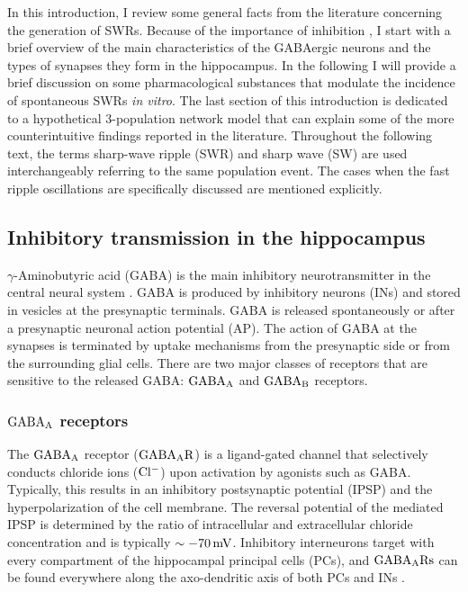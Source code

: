   In this introduction, I review some general facts from the literature
  concerning the generation of SWRs. Because of the importance of inhibition
  \citep[e.g.,][]{Maier2003, Schlingloff2014}, I start with a brief overview of
  the main characteristics of the GABAergic neurons and the types of synapses
  they form in the hippocampus. In the following I will provide a brief
  discussion on some pharmacological substances that modulate the incidence of
  spontaneous SWRs \textit{in vitro}. The last section of this introduction is
  dedicated to a hypothetical 3-population network model that can explain some
  of the more counterintuitive findings reported in the literature. Throughout
  the following text, the terms sharp-wave ripple (SWR) and sharp wave (SW) are
  used interchangeably referring to the same population event. The cases when
  the fast ripple oscillations are specifically discussed are mentioned
  explicitly.

  \subsection{Inhibitory transmission in the hippocampus}
    $\gamma$-Aminobutyric acid (GABA) is the main inhibitory neurotransmitter
    in the central neural system \citep{Sivilotti1991}. GABA is produced by
    inhibitory neurons (INs) and stored in vesicles at the presynaptic
    terminals. GABA is released spontaneously or after a presynaptic neuronal
    action potential (AP). The action of GABA at the synapses is terminated by
    uptake mechanisms from the presynaptic side or from the surrounding glial
    cells. There are two major classes of receptors that are sensitive to the
    released GABA: $\rm GABA_A$ and $\rm GABA_B$ receptors. 

    \subsubsection{$\rm GABA_A$ receptors}
    \label{sec:gabaa}
      The $\rm GABA_A $ receptor ($\rm GABA_A R$) is a ligand-gated channel
      that selectively conducts chloride ions ($\rm Cl^-$) upon activation by
      agonists such as GABA. Typically, this results in an inhibitory
      postsynaptic potential (IPSP) and the hyperpolarization of the cell
      membrane. The reversal potential of the mediated IPSP is determined by
      the ratio of intracellular and extracellular chloride concentration and
      is typically $\sim -70\, \rm mV$. Inhibitory interneurons target with
      every compartment of the hippocampal principal cells (PCs), and $\rm
      GABA_ARs$ can be found everywhere along the axo-dendritic axis of both
      PCs and INs \citep{Kullmann2005}.

